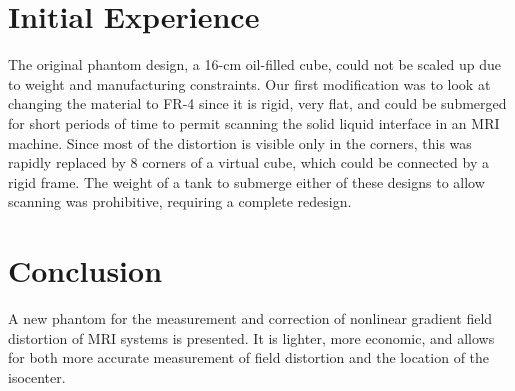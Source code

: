 \section{Initial Experience}

The original phantom design, a 16-cm oil-filled cube, could not be scaled up due to weight and manufacturing
constraints. Our first modification was to look at changing the material to FR-4 since it is rigid, very flat,
and could be submerged for short periods of time to permit scanning the solid liquid interface in an MRI
machine.  Since most of the distortion is visible only in the corners, this was rapidly replaced by 8 corners
of a virtual cube, which could be connected by a rigid frame.  The weight of a tank to submerge either of
these designs to allow scanning was prohibitive, requiring a complete redesign.

\section{Conclusion}

A new phantom for the measurement and correction of nonlinear gradient field distortion of MRI systems is
presented.  It is lighter, more economic, and allows for both more accurate measurement of field distortion
and the location of the isocenter. 